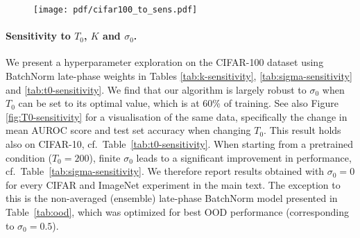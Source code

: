 \documentclass{article} \usepackage{iclr2021_conference,times}
\begin{document}
\begin{figure}
  \centering
  \begin{center}
    \texttt{[image: pdf/cifar100\_to\_sens.pdf]}
  \end{center}
   \vspace{-0.4cm}
\end{figure}

\paragraph{Sensitivity to $T_0$, $K$ and $\sigma_0$.} We present a hyperparameter exploration on the CIFAR-100 dataset using BatchNorm late-phase weights in Tables  \ref{tab:k-sensitivity}, \ref{tab:sigma-sensitivity} and \ref{tab:t0-sensitivity}. We find that our algorithm is largely robust to $\sigma_0$ when $T_0$ can be set to its optimal value, which is at 60\% of training. See also Figure \ref{fig:T0-sensitivity} for a visualisation of the same data, specifically the change in mean AUROC score and test set accuracy when changing $T_0$. This result holds also on CIFAR-10, cf.~Table~\ref{tab:t0-sensitivity}. When starting from a pretrained condition ($T_0=200$), finite $\sigma_0$ leads to a significant improvement in performance, cf.~Table~\ref{tab:sigma-sensitivity}. We therefore report results obtained with $\sigma_0=0$ for every CIFAR and ImageNet experiment in the main text. The exception to this is the non-averaged (ensemble) late-phase BatchNorm model presented in Table~\ref{tab:ood}, which was optimized for best OOD performance (corresponding to $\sigma_0=0.5$).
\end{document}
